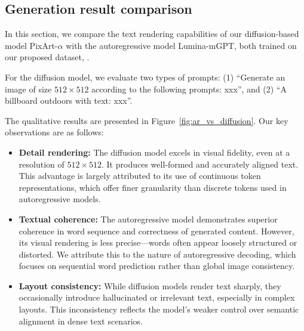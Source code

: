 


\subsection{Generation result comparison}
In this section, we compare the text rendering capabilities of our diffusion-based model PixArt-$\alpha$ with the autoregressive model Lumina-mGPT, both trained on our proposed dataset, \DatasetName.

For the diffusion model, we evaluate two types of prompts:
(1) “Generate an image of size $512 \times 512$ according to the following prompts: xxx”, and
(2) “A billboard outdoors with text: xxx”.

The qualitative results are presented in Figure~\ref{fig:ar_vs_diffusion}. Our key observations are as follows:

\begin{itemize}
\item \textbf{Detail rendering:} The diffusion model excels in visual fidelity, even at a resolution of $512 \times 512$. It produces well-formed and accurately aligned text. This advantage is largely attributed to its use of continuous token representations, which offer finer granularity than discrete tokens used in autoregressive models.

\item \textbf{Textual coherence:} The autoregressive model demonstrates superior coherence in word sequence and correctness of generated content. However, its visual rendering is less precise—words often appear loosely structured or distorted. We attribute this to the nature of autoregressive decoding, which focuses on sequential word prediction rather than global image consistency.

\item \textbf{Layout consistency:} While diffusion models render text sharply, they occasionally introduce hallucinated or irrelevant text, especially in complex layouts. This inconsistency reflects the model’s weaker control over semantic alignment in dense text scenarios.
\end{itemize}










